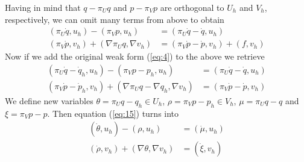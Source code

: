 \documentclass[12pt]{article}
\begin{document}
Having in mind that $q - \pi_U q$ and $p - \pi_V p$ are orthogonal to $U_h$ and $V_h$, respectively, we can omit many terms from above to obtain
\begin{equation} \label{eq:14}
\begin{aligned}
	(\pi_U\dot q,u_h) - (\pi_V p , u_h) &= (\pi_U \dot q - \dot q , u_h) \\
	(\pi_V \dot p, v_h) + (\nabla \pi_U q, \nabla v_h) &= (\pi_V \dot p - \dot p, v_h) + (f,v_h)
\end{aligned}
\end{equation}
Now if we add the original weak form (\ref{eq:4}) to the above we retrieve
\begin{equation} \label{eq:15}
\begin{aligned}
	(\pi_U \dot q - \dot q_h , u_h) - (\pi_V p - p_h, u_h ) &= (\pi_U \dot q - \dot q , u_h) \\
	(\pi_V \dot p - \dot p_h, v_h) + (\nabla \pi_U q - \nabla q_h , \nabla v_h) &= (\pi_V \dot p - \dot p, v_h)
\end{aligned}
\end{equation}
We define new variables $\theta = \pi_U q - q_h \in U_h$, $\rho = \pi_V p - p_h\in V_h$, $\mu = \pi_U q - q$ and  $\xi = \pi_V p  - p$. Then equation (\ref{eq:15}) turns into
\begin{equation} \label{eq:16}
\begin{aligned}
	(\dot \theta , u_h) - (\rho, u_h ) &= (\dot \mu , u_h) \\
	(\dot \rho,v_h) + (\nabla \theta , \nabla v_h) &= (\dot \xi, v_h)
\end{aligned}
\end{equation}
\end{document}
